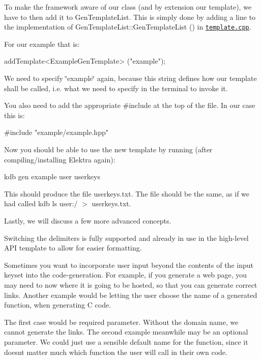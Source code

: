 To make the framework aware of our class (and by extension our template), we have to then add it to {\ttfamily Gen\+Template\+List}. This is simply done by adding a line to the implementation of {\ttfamily Gen\+Template\+List\+::\+Gen\+Template\+List ()} in \href{/home/jenkins/workspace/libelektra-release/src/tools/kdb/gen/template.cpp}{\tt {\ttfamily template.\+cpp}}.

For our example that is\+:


\begin{DoxyCode}
addTemplate<ExampleGenTemplate> (\textcolor{stringliteral}{"example"});
\end{DoxyCode}


We need to specify {\ttfamily \char`\"{}example\char`\"{}} again, because this string defines how our template shall be called, i.\+e. what we need to specify in the terminal to invoke it.

You also need to add the appropriate {\ttfamily \#include} at the top of the file. In our case this is\+:


\begin{DoxyCode}
\textcolor{preprocessor}{#include "example/example.hpp"}
\end{DoxyCode}


Now you should be able to use the new template by running (after compiling/installing Elektra again)\+:


\begin{DoxyCode}
kdb gen example user userkeys
\end{DoxyCode}


This should produce the file {\ttfamily userkeys.\+txt}. The file should be the same, as if we had called {\ttfamily kdb ls user\+:/ $>$ userkeys.\+txt}.

Lastly, we will discuss a few more advanced concepts.

Switching the delimiters is fully supported and already in use in the high-\/level A\+PI template to allow for easier formatting.

Sometimes you want to incorporate user input beyond the contents of the input keyset into the code-\/generation. For example, if you generate a web page, you may need to now where it is going to be hosted, so that you can generate correct links. Another example would be letting the user choose the name of a generated function, when generating C code.

The first case would be required parameter. Without the domain name, we cannot generate the links. The second example meanwhile may be an optional parameter. We could just use a sensible default name for the function, since it doesn\textquotesingle{}t matter much which function the user will call in their own code.

